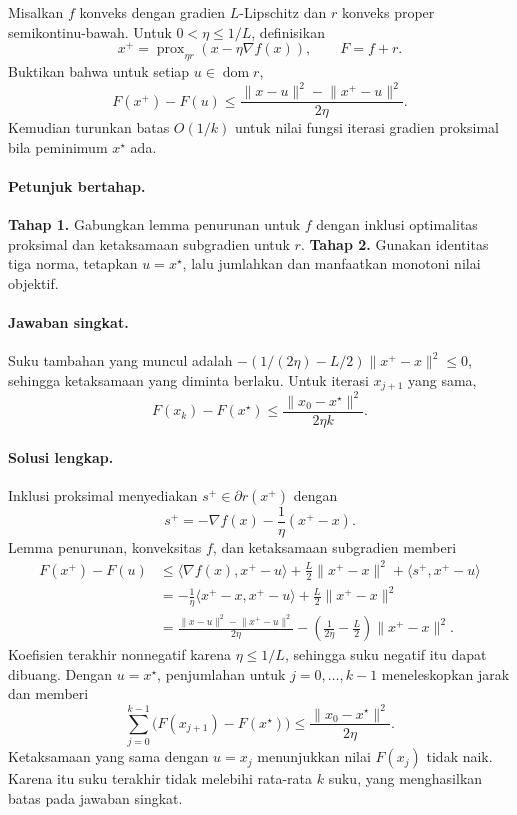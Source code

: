 \begin{exercise}
\label{orig03:midterm:exercise:0003}
Misalkan $f$ konveks dengan gradien $L$-Lipschitz dan $r$ konveks proper
semikontinu-bawah. Untuk $0<\eta\le1/L$, definisikan
\[
 x^+=\operatorname{prox}_{\eta r}(x-\eta\nabla f(x)),
 \qquad F=f+r.
\]
Buktikan bahwa untuk setiap $u\in\operatorname{dom}r$,
\[
 F(x^+)-F(u)
 \le\frac{\lVert x-u\rVert^2-\lVert x^+-u\rVert^2}{2\eta}.
\]
Kemudian turunkan batas $O(1/k)$ untuk nilai fungsi iterasi gradien proksimal
bila peminimum $x^\star$ ada.
\end{exercise}

\paragraph{Petunjuk bertahap.}
\label{orig03:midterm:hint:0003}
\textbf{Tahap 1.} Gabungkan lemma penurunan untuk $f$ dengan inklusi
optimalitas proksimal dan ketaksamaan subgradien untuk $r$.
\textbf{Tahap 2.} Gunakan identitas tiga norma, tetapkan $u=x^\star$, lalu
jumlahkan dan manfaatkan monotoni nilai objektif.

\paragraph{Jawaban singkat.}
\label{orig03:midterm:answer:0003}
Suku tambahan yang muncul adalah
$-(1/(2\eta)-L/2)\lVert x^+-x\rVert^2\le0$, sehingga ketaksamaan yang diminta
berlaku. Untuk iterasi $x_{j+1}$ yang sama,
\[
 F(x_k)-F(x^\star)
 \le\frac{\lVert x_0-x^\star\rVert^2}{2\eta k}.
\]

\paragraph{Solusi lengkap.}
\label{orig03:midterm:solution:0003}
Inklusi proksimal menyediakan $s^+\in\partial r(x^+)$ dengan
\[
 s^+=-\nabla f(x)-\frac1\eta(x^+-x).
\]
Lemma penurunan, konveksitas $f$, dan ketaksamaan subgradien memberi
\begin{align*}
 F(x^+)-F(u)
 &\le \langle\nabla f(x),x^+-u\rangle
      +\frac L2\lVert x^+-x\rVert^2
      +\langle s^+,x^+-u\rangle\\
 &=-\frac1\eta\langle x^+-x,x^+-u\rangle
      +\frac L2\lVert x^+-x\rVert^2\\
 &=\frac{\lVert x-u\rVert^2-\lVert x^+-u\rVert^2}{2\eta}
   -\left(\frac1{2\eta}-\frac L2\right)\lVert x^+-x\rVert^2.
\end{align*}
Koefisien terakhir nonnegatif karena $\eta\le1/L$, sehingga suku negatif itu
dapat dibuang. Dengan $u=x^\star$, penjumlahan untuk $j=0,\ldots,k-1$
meneleskopkan jarak dan memberi
\[
 \sum_{j=0}^{k-1}\bigl(F(x_{j+1})-F(x^\star)\bigr)
 \le\frac{\lVert x_0-x^\star\rVert^2}{2\eta}.
\]
Ketaksamaan yang sama dengan $u=x_j$ menunjukkan nilai $F(x_j)$ tidak naik.
Karena itu suku terakhir tidak melebihi rata-rata $k$ suku, yang menghasilkan
batas pada jawaban singkat.

